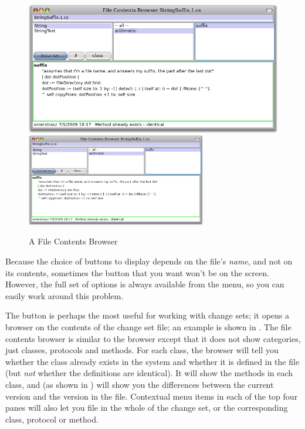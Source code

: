 \documentclass[a4paper,10pt,twoside]{book}
\begin{document}
\begin{figure}[btp]
	\begin{center}
	\ifluluelse
		{\includegraphics[width=\textwidth]{fileContentsBrowser}}
		{\includegraphics[width=0.7\textwidth]{fileContentsBrowser}}
	\end{center}
	\caption{A File Contents Browser}
\end{figure}

Because the choice of buttons to display depends on the file's \emph{name}, and not on its contents, sometimes the button that you want won't be on the screen.  
However, the full set of options is always available from the \actclick {} menu, so
you can easily work around this problem.

The  button is perhaps the most useful for working with change sets; it opens a browser on the contents of the change set file; an example is shown in .
The file contents browser is similar to the browser except that it does not show categories, just classes, protocols and methods.
For each class, the browser will tell you whether the class already exists in the system and whether it is defined in the file (but \emph{not} whether the definitions are identical).  
It will show the methods in each class, and (as shown in ) will show you the differences between the current version and the version in the file.
Contextual menu items in each of the top four panes will also let you file in the whole of the change set, or the corresponding class, protocol or method. 
\end{document}
